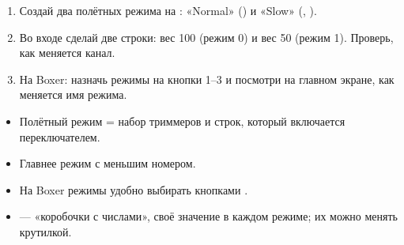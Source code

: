 \begin{tryit}
\begin{enumerate}
  \item Создай два полётных режима на : «Normal» () и «Slow» (, ).
  \item Во входе  сделай две строки: вес 100 (режим 0) и вес 50 (режим 1).
        Проверь, как меняется канал.
  \item На Boxer: назначь режимы на кнопки 1--3 и посмотри на главном экране, как меняется
        имя режима.
\end{enumerate}
\end{tryit}

\begin{summary}
\begin{itemize}
  \item Полётный режим = набор триммеров и строк, который включается переключателем.
  \item Главнее режим с меньшим номером.
  \item На Boxer режимы удобно выбирать кнопками .
  \item {} --- «коробочки с числами», своё значение в каждом режиме; их можно менять крутилкой.
\end{itemize}
\end{summary}
